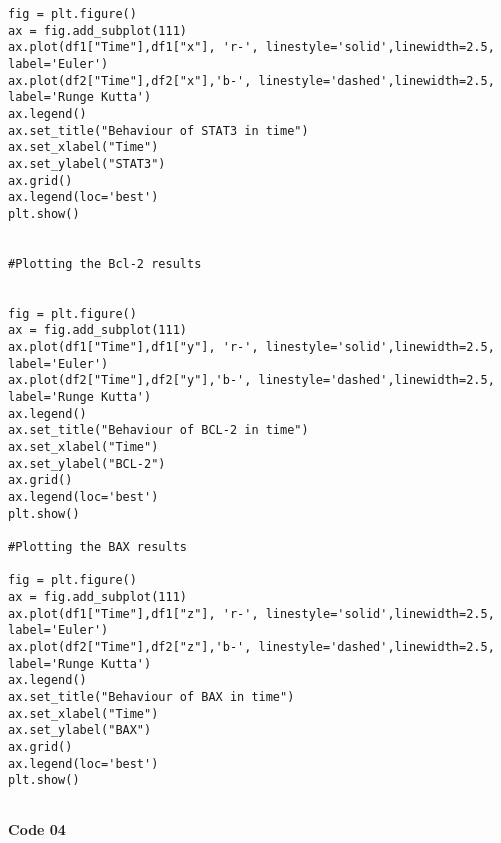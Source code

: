 \begin{framed}
\begin{verbatim}
fig = plt.figure()
ax = fig.add_subplot(111)
ax.plot(df1["Time"],df1["x"], 'r-', linestyle='solid',linewidth=2.5, 
label='Euler')
ax.plot(df2["Time"],df2["x"],'b-', linestyle='dashed',linewidth=2.5, 
label='Runge Kutta')
ax.legend()
ax.set_title("Behaviour of STAT3 in time")
ax.set_xlabel("Time")
ax.set_ylabel("STAT3")
ax.grid()
ax.legend(loc='best')
plt.show()


#Plotting the Bcl-2 results


fig = plt.figure()
ax = fig.add_subplot(111)
ax.plot(df1["Time"],df1["y"], 'r-', linestyle='solid',linewidth=2.5, 
label='Euler')
ax.plot(df2["Time"],df2["y"],'b-', linestyle='dashed',linewidth=2.5, 
label='Runge Kutta')
ax.legend()
ax.set_title("Behaviour of BCL-2 in time")
ax.set_xlabel("Time")
ax.set_ylabel("BCL-2")
ax.grid()
ax.legend(loc='best')
plt.show()

#Plotting the BAX results

fig = plt.figure()
ax = fig.add_subplot(111)
ax.plot(df1["Time"],df1["z"], 'r-', linestyle='solid',linewidth=2.5, 
label='Euler')
ax.plot(df2["Time"],df2["z"],'b-', linestyle='dashed',linewidth=2.5, 
label='Runge Kutta')
ax.legend()
ax.set_title("Behaviour of BAX in time")
ax.set_xlabel("Time")
ax.set_ylabel("BAX")
ax.grid()
ax.legend(loc='best')
plt.show()


\end{verbatim}
\end{framed}

\newpage

\textbf{\Large Code 04}

